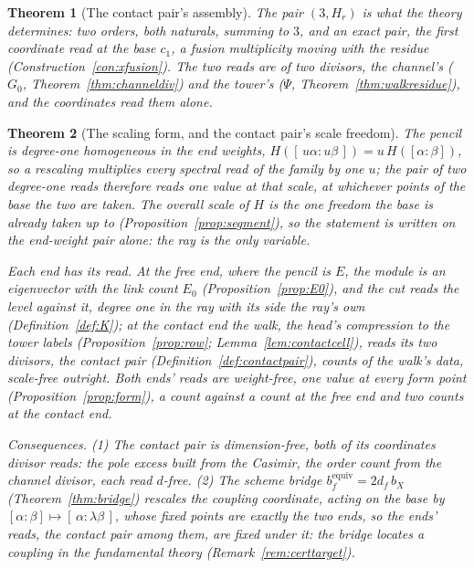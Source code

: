 \documentclass[11pt]{article}
\newtheorem{theorem}{Theorem}
\theoremstyle{definition}
\newcommand{\lam}{\lambda}
\begin{document}
\begin{theorem}[The contact pair's assembly]
The pair $(3,H_r)$ is what the theory determines: two orders, both
naturals,
summing to $3$, and an exact pair, the first coordinate read at the base
$c_1$, a fusion multiplicity moving with the residue
(Construction~\ref{con:xfusion}). The two reads are of two divisors, the channel's ($G_0$, Theorem~\ref{thm:channeldiv}) and the tower's
($\Psi$, Theorem~\ref{thm:walkresidue}), and the coordinates read
them alone.
\end{theorem}

\begin{theorem}[The scaling form, and the contact pair's scale freedom]
\label{thm:unitschain}
The pencil is degree-one homogeneous in the end weights,
$H([\,u\alpha\!:\!u\beta\,])=u\,H([\alpha\!:\!\beta])$, so a rescaling
multiplies every spectral read of the family by one $u$; the pair
of two degree-one reads therefore reads one value at that scale, at
whichever
points of the base the two are taken. The overall scale of $H$ is the one
freedom the
base is already taken up to (Proposition~\ref{prop:segment}), so the
statement is
written on the end-weight pair alone: \emph{the ray is the only variable}.

\emph{Each end has its read.} At the free end, where the pencil is
$E$, the module is an eigenvector with the link count $E_0$
(Proposition~\ref{prop:E0}), and the cut reads the level against
it, degree one in the ray with its side the ray's own
(Definition~\ref{def:K}); at the contact end the walk, the head's
compression to the tower labels (Proposition~\ref{prop:row};
Lemma~\ref{lem:contactcell}), reads its two divisors, the
contact pair (Definition~\ref{def:contactpair}), counts of the
walk's data, scale-free outright. Both ends' reads are weight-free,
one value at every form point (Proposition~\ref{prop:form}), a
count against a count at the free end and two counts at the
contact end.

\emph{Consequences.} (1) The contact pair is
dimension-free, both of its coordinates divisor reads: the pole
excess built from the Casimir, the order count from the channel
divisor, each read $d$-free.
(2) The scheme bridge $b_f^{\mathrm{equiv}}=2d_f\,b_X$
(Theorem~\ref{thm:bridge}) rescales the coupling coordinate, acting on
the base by $[\alpha\!:\!\beta]\mapsto[\,\alpha\!:\!\lam\beta\,]$, whose fixed points are
\emph{exactly} the two ends, so the ends' reads, the contact pair
among them, are fixed under it: the
bridge locates a coupling in the fundamental theory
(Remark~\ref{rem:certtarget}).

\end{theorem}
\end{document}
